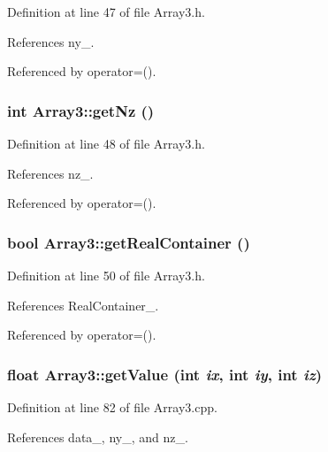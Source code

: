Definition at line 47 of file Array3.h.



References ny\_\-.



Referenced by operator=().

\subsubsection[{getNz}]{\setlength{\rightskip}{0pt plus 5cm}int Array3::getNz ()}\label{classArray3_ab4eecc4fa31e18f0ce10ea7848e5b814}


Definition at line 48 of file Array3.h.



References nz\_\-.



Referenced by operator=().

\subsubsection[{getRealContainer}]{\setlength{\rightskip}{0pt plus 5cm}bool Array3::getRealContainer ()}\label{classArray3_a38b29b4540631fbdeba40c44bc97a0b7}


Definition at line 50 of file Array3.h.



References RealContainer\_\-.



Referenced by operator=().

\subsubsection[{getValue}]{\setlength{\rightskip}{0pt plus 5cm}float Array3::getValue (int {\em ix}, \/  int {\em iy}, \/  int {\em iz})}\label{classArray3_a7cf0475d19ea0f88976694dd61ae9f85}


Definition at line 82 of file Array3.cpp.



References data\_\-, ny\_\-, and nz\_\-.



